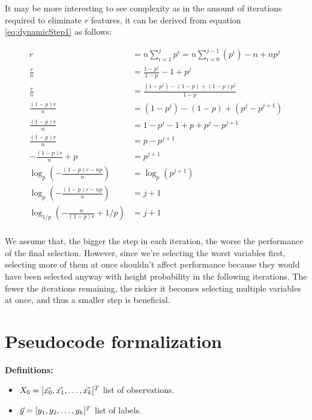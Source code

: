 It may be more interesting to see complexity as in the amount of iterations re\-quired to eliminate $r$ features, it can be derived from equation \ref{eq:dynamicStep1} as follows:

\begin{align*}
    r &= n \sum_{i = 1}^{j}{p^i} = n \sum_{i = 0}^{j-1}{(p^i)} - n + np^j \\
    \frac{r}{n} &= \frac{1-p^j}{1-p} - 1 + p^j \\
    \frac{r}{n} &= \frac{(1-p^j) - (1-p) + (1-p)p^j}{1-p}\\
    \frac{(1-p)r}{n} &= (1-p^j) - (1-p) + (p^j-p^{j+1})\\
    \frac{(1-p)r}{n} &= 1 -p^j -1 + p + p^j - p^{j+1}\\
    \frac{(1-p)r}{n} &= p - p^{j+1}\\
    - \frac{(1-p)r}{n} + p &= p^{j+1}\\
    \log_{p} \left( - \frac{(1-p)r - np}{n} \right) &= \log_{p} (p^{j+1})\\
    \log_{p} \left( - \frac{(1-p)r - np}{n} \right) &= j + 1\\
    \log_{1/p} \left( - \frac{n}{(1-p)r} + 1/p \right) &= j + 1\\
\end{align*}
\fi

We assume that, the bigger the step in each iteration, the worse the performance of the final selection. However, since we're selecting the worst variables first, se\-lect\-ing more of them at once shouldn't affect performance because they would have been selected anyway with height probability in the following iterations. The fewer the iterations remaining, the riskier it becomes selecting multiple variables at once, and thus a smaller step is beneficial.

\section{Pseudocode formalization}

\textbf{Definitions:}

\begin{itemize}
    \item $X_0 = [\vec{x_0}, \vec{x_1}, \dotsc, \vec{x_k}]^T$ list of observations.
    \item $\vec{y} = [y_1, y_2, \dotsc, y_k]^T$ list of labels.
\end{itemize}

